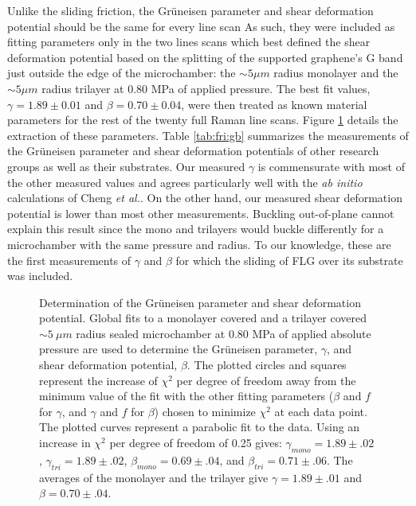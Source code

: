 Unlike the sliding friction, the Gr\"{u}neisen parameter and shear deformation potential should be the same for every line scan
As such, they were included as fitting parameters only in the two lines scans which best defined the shear deformation potential based on the splitting of the supported graphene's G band just outside the edge of the microchamber: the $\sim 5 \mu m$ radius monolayer and the $\sim 5 \mu m$ radius trilayer at 0.80 MPa of applied pressure.
The best fit values, $\gamma=1.89 \pm 0.01$ and $\beta=0.70 \pm 0.04$, were then treated as known material parameters for the rest of the twenty full Raman line scans.
Figure \ref{fig:fri:gammabeta} details the extraction of these parameters.
Table \ref{tab:fri:gb} summarizes the measurements of the Gr\"{u}neisen parameter and shear deformation potentials of other research groups as well as their substrates.
Our measured $\gamma$ is commensurate with most of the other measured values and agrees particularly well with the \textit{ab initio} calculations of Cheng \emph{et al.}\cite{Cheng2011}.
On the other hand, our measured shear deformation potential is lower than most other measurements.
Buckling out-of-plane cannot explain this result since the mono and trilayers would buckle differently for a microchamber with the same pressure and radius.
To our knowledge, these are the first measurements of $\gamma$ and $\beta$ for which the sliding of FLG over its substrate was included.

\begin{figure}
	\begin{center}
	
	\end{center}
	\caption[Determination of the Gr\"{u}neisen parameter and shear deformation potential]{\label{fig:fri:gammabeta}Determination of the Gr\"{u}neisen parameter and shear deformation potential. Global fits to a monolayer covered and a trilayer covered $\sim 5 \ \mu m$ radius sealed microchamber at 0.80 MPa of applied absolute pressure are used to determine the Gr\"{u}neisen parameter, $\gamma$, and shear deformation potential, $\beta$. The plotted circles and squares represent the increase of $\chi^2$ per degree of freedom away from the minimum value of the fit with the other fitting parameters ($\beta$ and $f$ for $\gamma$, and $\gamma$ and $f$ for $\beta$) chosen to minimize $\chi^2$ at each data point. The plotted curves represent a parabolic fit to the data. Using an increase in $\chi^2$ per degree of freedom of 0.25 gives: $\gamma_{mono} = 1.89 \pm .02$, $\gamma_{tri} = 1.89 \pm .02$, $\beta_{mono} = 0.69 \pm .04$, and $\beta_{tri} = 0.71 \pm .06$. The averages of the monolayer and the trilayer give $\gamma=1.89 \pm .01$ and $\beta= 0.70 \pm .04$.}
\end{figure}

